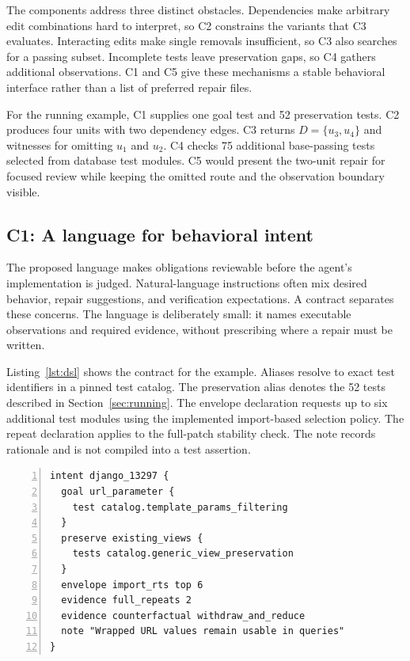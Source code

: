 \documentclass[a4paper,fleqn]{cas-sc}
\newcommand{\dsl}{\textsc{Shift-Intent}}
\begin{document}
The components address three distinct obstacles. Dependencies make arbitrary edit combinations hard to interpret, so C2 constrains the variants that C3 evaluates. Interacting edits make single removals insufficient, so C3 also searches for a passing subset. Incomplete tests leave preservation gaps, so C4 gathers additional observations. C1 and C5 give these mechanisms a stable behavioral interface rather than a list of preferred repair files.

For the running example, C1 supplies one goal test and 52 preservation tests. C2 produces four units with two dependency edges. C3 returns $D=\{u_3,u_4\}$ and witnesses for omitting $u_1$ and $u_2$. C4 checks 75 additional base-passing tests selected from database test modules. C5 would present the two-unit repair for focused review while keeping the omitted route and the observation boundary visible.

\subsection{C1: A language for behavioral intent}\label{sec:dsl}

The proposed language makes obligations reviewable before the agent's implementation is judged. Natural-language instructions often mix desired behavior, repair suggestions, and verification expectations. A contract separates these concerns. The language is deliberately small: it names executable observations and required evidence, without prescribing where a repair must be written.

Listing~\ref{lst:dsl} shows the contract for the example. Aliases resolve to exact test identifiers in a pinned test catalog. The preservation alias denotes the 52 tests described in Section~\ref{sec:running}. The envelope declaration requests up to six additional test modules using the implemented import-based selection policy. The repeat declaration applies to the full-patch stability check. The note records rationale and is not compiled into a test assertion.

\begin{lstlisting}[numbers=left,caption={Proposed \dsl{} contract. Test aliases are resolved before execution.},label=lst:dsl]
intent django_13297 {
  goal url_parameter {
    test catalog.template_params_filtering
  }
  preserve existing_views {
    tests catalog.generic_view_preservation
  }
  envelope import_rts top 6
  evidence full_repeats 2
  evidence counterfactual withdraw_and_reduce
  note "Wrapped URL values remain usable in queries"
}
\end{lstlisting}
\end{document}
